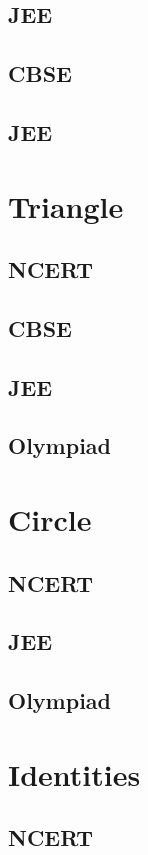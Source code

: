 \documentclass[journal]{IEEEtran}
\begin{document}
\subsection{JEE}

\iffalse
\subsection{CBSE}

\subsection{JEE}

%
\section{Triangle}
\subsection{NCERT}

\subsection{CBSE}

\subsection{JEE}
 
\subsection{Olympiad}

\section{Circle}
\subsection{NCERT}

\subsection{JEE}

\subsection{Olympiad}

%
\section{Identities}
\subsection{NCERT}
 
\end{document}
